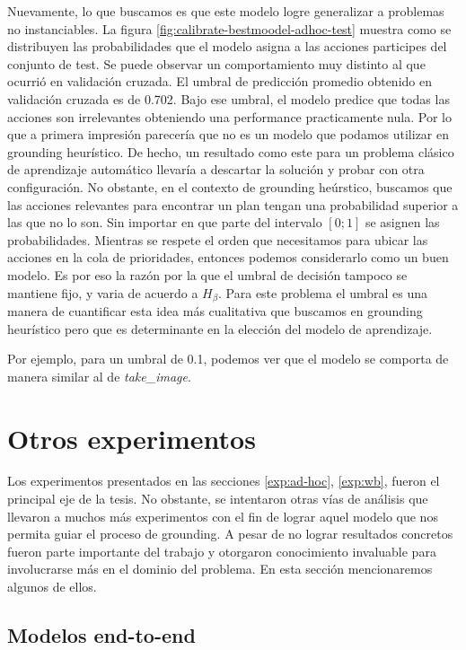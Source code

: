 Nuevamente, lo que buscamos es que este modelo logre generalizar a problemas no
instanciables. La figura \ref{fig:calibrate-bestmoodel-adhoc-test} muestra como
se distribuyen las probabilidades que el modelo asigna a las acciones participes
del conjunto de test. Se puede observar un comportamiento muy distinto al que
ocurrió en validación cruzada. El umbral de predicción promedio obtenido en
validación cruzada es de 0.702. Bajo ese umbral, el modelo predice que todas las
acciones son irrelevantes obteniendo una performance practicamente nula. Por lo
que a primera impresión parecería que no es un modelo que podamos utilizar en
grounding heurístico. De hecho, un resultado como este para un problema clásico
de aprendizaje automático llevaría a descartar la solución y probar con otra
configuración. No obstante, en el contexto de grounding heúrstico, buscamos que
las acciones relevantes para encontrar un plan tengan una probabilidad superior
a las que no lo son. Sin importar en que parte del intervalo $[0;1]$ se asignen
las probabilidades. Mientras se respete el orden que necesitamos para ubicar las
acciones en la cola de prioridades, entonces podemos considerarlo como un buen
modelo. Es por eso la razón por la que el umbral de decisión tampoco se mantiene
fijo, y varia de acuerdo a $H_{\beta}$. Para este problema el umbral es una
manera de cuantificar esta idea más cualitativa que buscamos en grounding
heurístico pero que es determinante en la elección del modelo de aprendizaje.

Por ejemplo, para un umbral de 0.1, podemos ver que el modelo se comporta de
manera similar al de \emph{take\_image}.

\section{Otros experimentos}

Los experimentos presentados en las secciones \ref{exp:ad-hoc}, \ref{exp:wb},
fueron el principal eje de la tesis. No obstante, se intentaron otras vías de
análisis que llevaron a muchos más experimentos con el fin de lograr aquel
modelo que nos permita guiar el proceso de grounding. A pesar de no lograr
resultados concretos fueron parte importante del trabajo y otorgaron
conocimiento invaluable para involucrarse más en el dominio del problema.
En esta sección mencionaremos algunos de ellos.

\subsection{Modelos end-to-end}

